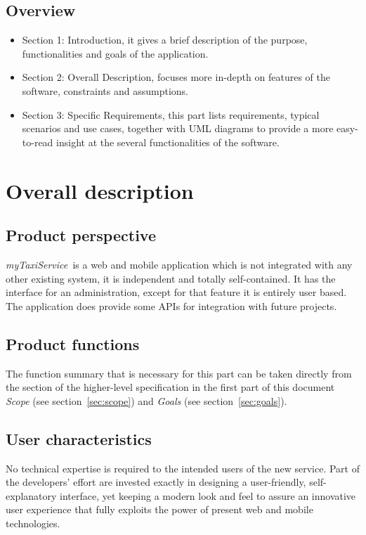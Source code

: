 \documentclass[a4paper,11pt]{report} %
\newcommand{\mts}{\mbox{\normalfont\itshape myTaxiService\ }}
\begin{document}
	\subsection{Overview}
		\begin{itemize}
			\item Section 1: Introduction, it gives a brief description of the purpose, functionalities and goals of the application.
			\item Section 2: Overall Description, focuses more in-depth on features of the software, constraints and assumptions.
			\item Section 3: Specific Requirements, this part lists requirements, typical scenarios	and use cases, together with UML diagrams to provide a more easy-to-read insight at the several functionalities of the software.
		\end{itemize}
	
	\pagebreak %
	
	\section{Overall description}
	
	\subsection{Product perspective} \mts is a web and mobile application which is not integrated with	any other existing system, it is independent and totally self-contained. It has the interface for an administration, except for that feature it is entirely user based. The application does provide some APIs for integration with future projects.
	
	\subsection{Product functions} The function summary that is necessary for this part can be taken directly from the section of the higher-level specification in the first part of this document {\em Scope} (see section~\ref{sec:scope}) and {\em Goals} (see section~\ref{sec:goals}).
	
	\subsection{User characteristics} No technical expertise is required to the intended users of the new service. Part of the developers' effort are invested exactly in designing a user-friendly, self-explanatory interface, yet keeping a modern look and feel to assure an innovative user experience that fully exploits the power of present web and mobile technologies.  
	
\end{document}
